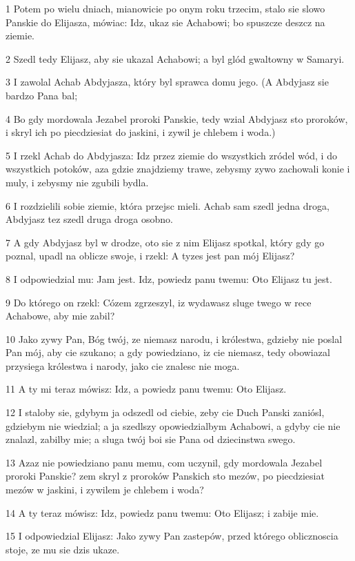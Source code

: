 \par 1 Potem po wielu dniach, mianowicie po onym roku trzecim, stalo sie slowo Panskie do Elijasza, mówiac: Idz, ukaz sie Achabowi; bo spuszcze deszcz na ziemie.
\par 2 Szedl tedy Elijasz, aby sie ukazal Achabowi; a byl glód gwaltowny w Samaryi.
\par 3 I zawolal Achab Abdyjasza, który byl sprawca domu jego. (A Abdyjasz sie bardzo Pana bal;
\par 4 Bo gdy mordowala Jezabel proroki Panskie, tedy wzial Abdyjasz sto proroków, i skryl ich po piecdziesiat do jaskini, i zywil je chlebem i woda.)
\par 5 I rzekl Achab do Abdyjasza: Idz przez ziemie do wszystkich zródel wód, i do wszystkich potoków, aza gdzie znajdziemy trawe, zebysmy zywo zachowali konie i muly, i zebysmy nie zgubili bydla.
\par 6 I rozdzielili sobie ziemie, która przejsc mieli. Achab sam szedl jedna droga, Abdyjasz tez szedl druga droga osobno.
\par 7 A gdy Abdyjasz byl w drodze, oto sie z nim Elijasz spotkal, który gdy go poznal, upadl na oblicze swoje, i rzekl: A tyzes jest pan mój Elijasz?
\par 8 I odpowiedzial mu: Jam jest. Idz, powiedz panu twemu: Oto Elijasz tu jest.
\par 9 Do którego on rzekl: Cózem zgrzeszyl, iz wydawasz sluge twego w rece Achabowe, aby mie zabil?
\par 10 Jako zywy Pan, Bóg twój, ze niemasz narodu, i królestwa, gdzieby nie poslal Pan mój, aby cie szukano; a gdy powiedziano, iz cie niemasz, tedy obowiazal przysiega królestwa i narody, jako cie znalesc nie moga.
\par 11 A ty mi teraz mówisz: Idz, a powiedz panu twemu: Oto Elijasz.
\par 12 I staloby sie, gdybym ja odszedl od ciebie, zeby cie Duch Panski zaniósl, gdziebym nie wiedzial; a ja szedlszy opowiedzialbym Achabowi, a gdyby cie nie znalazl, zabilby mie; a sluga twój boi sie Pana od dziecinstwa swego.
\par 13 Azaz nie powiedziano panu memu, com uczynil, gdy mordowala Jezabel proroki Panskie? zem skryl z proroków Panskich sto mezów, po piecdziesiat mezów w jaskini, i zywilem je chlebem i woda?
\par 14 A ty teraz mówisz: Idz, powiedz panu twemu: Oto Elijasz; i zabije mie.
\par 15 I odpowiedzial Elijasz: Jako zywy Pan zastepów, przed którego oblicznoscia stoje, ze mu sie dzis ukaze.
